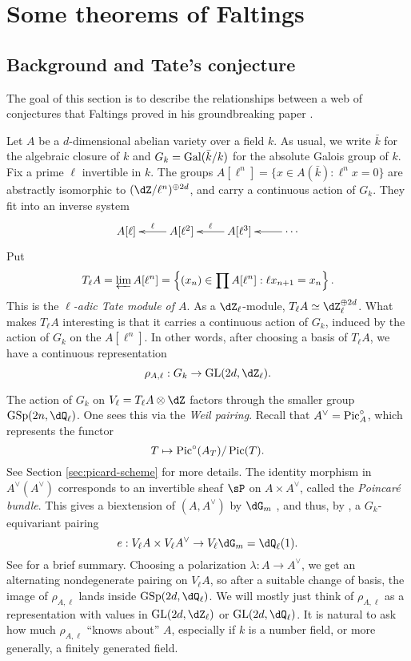 




\section{Some theorems of Faltings}





\subsection{Background and Tate's conjecture}

The goal of this section is to describe the relationships between a web of 
conjectures that Faltings proved in his groundbreaking paper 
\cite{fa86}. 

Let $A$ be a $d$-dimensional abelian variety over a field $k$. As usual, we 
write $\bar k$ for the algebraic closure of $k$ and $G_k=\operatorname{Gal}(\bar k/k)$ for 
the absolute Galois group of $k$. Fix a prime $\ell$ invertible in $k$. The 
groups $A[\ell^n] = \{x\in A(\bar k):\ell^n x=0\}$ are abstractly isomorphic 
to $(\dZ/\ell^n)^{\oplus 2d}$, and carry a continuous action of $G_k$. They 
fit into an inverse system 
\[\xymatrix{
  A[\ell] 
    & A[\ell^2] \ar[l]_-\ell 
    & A[\ell^3] \ar[l]_-\ell 
    & \cdots \ar[l]
}\]
Put 
\[
  T_\ell A = \varprojlim A[\ell^n] = \left\{(x_n)\in \prod A[\ell^n] : \ell x_{n+1} = x_n\right\} \text{.}
\]
This is the \emph{$\ell$-adic Tate module of $A$}. As a $\dZ_\ell$-module, 
$T_\ell A \simeq \dZ_\ell^{\oplus 2 d}$. What makes $T_\ell A$ interesting is 
that it carries a continuous action of $G_k$, induced by the action of $G_k$ 
on the $A[\ell^n]$. In other words, after choosing a basis of $T_\ell A$, we 
have a continuous representation 
\[
  \rho_{A,\ell} : G_k \to \operatorname{GL}(2 d,\dZ_\ell) \text{.}
\]

The action of $G_k$ on $V_\ell = T_\ell A\otimes\dZ$ factors through 
the smaller group $\operatorname{GSp}(2 n,\dQ_\ell)$. One sees this via the 
\emph{Weil pairing}. Recall that $A^\vee = \operatorname{Pic}_A^\circ$, which represents 
the functor 
\[
  T \mapsto \operatorname{Pic}^\circ(A_T)/\operatorname{Pic}(T) \text{.}
\]
See Section \ref{sec:picard-scheme} for more details. The identity morphism 
in $A^\vee(A^\vee)$ corresponds to an invertible sheaf $\sP$ on 
$A\times A^\vee$, called the \emph{Poincar\'e bundle}. This gives a 
biextension of $(A,A^\vee)$ by $\dG_m$ \cite[VII 2.9.5]{gr72}, and thus, by 
\cite[VIII 2.2]{gr72}, a $G_k$-equivariant pairing 
\[
  e:V_\ell A \times V_\ell A^\vee \to V_\ell \dG_m = \dQ_\ell(1) \text{.}
\]
See \cite[IX 1.0]{gr72} for a brief summary. Choosing a polarization 
$\lambda:A \to A^\vee$, we get an alternating nondegenerate pairing on 
$V_\ell A$, so after a suitable change of basis, the image of 
$\rho_{A,\ell}$ lands inside $\operatorname{GSp}(2 d,\dQ_\ell)$. We will mostly 
just think of $\rho_{A,\ell}$ as a representation with values in 
$\operatorname{GL}(2 d,\dZ_\ell)$ or $\operatorname{GL}(2 d,\dQ_\ell)$. It is 
natural to ask how much $\rho_{A,\ell}$ ``knows about'' $A$, especially if $k$ 
is a number field, or more generally, a finitely generated field. 

